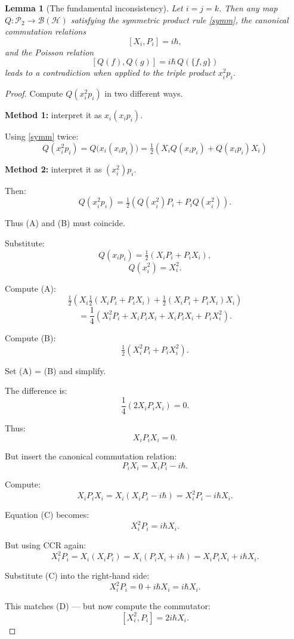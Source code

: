 \documentclass[12pt,oneside]{book}
\theoremstyle{plain}
\newtheorem{lemma}[theorem]{Lemma}
\theoremstyle{definition}
\begin{document}
\begin{lemma}[The fundamental inconsistency]
Let $i=j=k$.
Then any map $Q:\mathcal{P}_2 \to \mathcal{B}(\mathcal{H})$
satisfying the symmetric product rule \eqref{symm},
the canonical commutation relations
\[
[X_i, P_i] = i\hbar,
\]
and the Poisson relation
\[
[Q(f),Q(g)] = i\hbar\,Q(\{f,g\})
\tag{2.2}
\label{CCRPoisson}
\]
leads to a contradiction when applied to the triple product $x_i^2 p_i$.
\end{lemma}

\begin{proof}
Compute $Q(x_i^2 p_i)$ in two different ways.

\medskip\noindent
\textbf{Method 1:} interpret it as $x_i (x_i p_i)$.

Using \eqref{symm} twice:
\[
Q(x_i^2 p_i)
= Q\bigl(x_i (x_i p_i)\bigr)
= \tfrac12(X_i Q(x_i p_i) + Q(x_i p_i) X_i)
\tag{A}
\]

\medskip\noindent
\textbf{Method 2:} interpret it as $(x_i^2) p_i$.

Then:
\[
Q(x_i^2 p_i)
= \tfrac12(Q(x_i^2) P_i + P_i Q(x_i^2)).
\tag{B}
\]

\medskip
Thus (A) and (B) must coincide.

Substitute:
\[
Q(x_i p_i) = \tfrac12(X_i P_i + P_i X_i),
\]
\[
Q(x_i^2) = X_i^2.
\]

Compute (A):
\[
\tfrac12\left(X_i \tfrac12(X_i P_i + P_i X_i)
  + \tfrac12(X_i P_i + P_i X_i) X_i\right)
\]
\[
= \frac14(X_i^2 P_i + X_i P_i X_i + X_i P_i X_i + P_i X_i^2).
\]

Compute (B):
\[
\tfrac12(X_i^2 P_i + P_i X_i^2).
\]

Set (A) = (B) and simplify.

The difference is:
\[
\frac14(2X_i P_i X_i) = 0.
\]

Thus:
\[
X_i P_i X_i = 0.
\tag{C}
\]

But insert the canonical commutation relation:
\[
P_i X_i = X_i P_i - i\hbar.
\]

Compute:
\[
X_i P_i X_i = X_i (X_i P_i - i\hbar) 
= X_i^2 P_i - i\hbar X_i.
\]

Equation (C) becomes:
\[
X_i^2 P_i = i\hbar X_i.
\tag{D}
\]

But using CCR again:
\[
X_i^2 P_i = X_i (X_i P_i) 
= X_i(P_i X_i + i\hbar)
= X_i P_i X_i + i\hbar X_i.
\]

Substitute (C) into the right-hand side:
\[
X_i^2 P_i = 0 + i\hbar X_i = i\hbar X_i.
\]

This matches (D) --- but now compute the commutator:
\[
[X_i^2, P_i] = 2i\hbar X_i.
\]


\end{proof}
\end{document}
